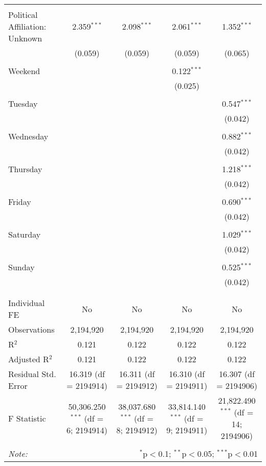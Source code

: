 \documentclass[
]{article}
\begin{document}
\begin{table}[!htbp]
{\begin{tabular}{@{\extracolsep{5pt}}lcccc}
  & & & & \\ 
 Political Affiliation: Unknown & 2.359$^{***}$ & 2.098$^{***}$ & 2.061$^{***}$ & 1.352$^{***}$ \\ 
  & (0.059) & (0.059) & (0.059) & (0.065) \\ 
  & & & & \\ 
 Weekend &  &  & 0.122$^{***}$ &  \\ 
  &  &  & (0.025) &  \\ 
  & & & & \\ 
 Tuesday &  &  &  & 0.547$^{***}$ \\ 
  &  &  &  & (0.042) \\ 
  & & & & \\ 
 Wednesday &  &  &  & 0.882$^{***}$ \\ 
  &  &  &  & (0.042) \\ 
  & & & & \\ 
 Thursday &  &  &  & 1.218$^{***}$ \\ 
  &  &  &  & (0.042) \\ 
  & & & & \\ 
 Friday &  &  &  & 0.690$^{***}$ \\ 
  &  &  &  & (0.042) \\ 
  & & & & \\ 
 Saturday &  &  &  & 1.029$^{***}$ \\ 
  &  &  &  & (0.042) \\ 
  & & & & \\ 
 Sunday &  &  &  & 0.525$^{***}$ \\ 
  &  &  &  & (0.042) \\ 
  & & & & \\ 
\hline \\[-1.8ex] 
Individual FE & No & No & No & No \\ 
Observations & 2,194,920 & 2,194,920 & 2,194,920 & 2,194,920 \\ 
R$^{2}$ & 0.121 & 0.122 & 0.122 & 0.122 \\ 
Adjusted R$^{2}$ & 0.121 & 0.122 & 0.122 & 0.122 \\ 
Residual Std. Error & 16.319 (df = 2194914) & 16.311 (df = 2194912) & 16.310 (df = 2194911) & 16.307 (df = 2194906) \\ 
F Statistic & 50,306.250$^{***}$ (df = 6; 2194914) & 38,037.680$^{***}$ (df = 8; 2194912) & 33,814.140$^{***}$ (df = 9; 2194911) & 21,822.490$^{***}$ (df = 14; 2194906) \\ 
\hline 
\hline \\[-1.8ex] 
\textit{Note:}  & \multicolumn{4}{r}{$^{*}$p$<$0.1; $^{**}$p$<$0.05; $^{***}$p$<$0.01} \\ 
\end{tabular}
} 
\end{table} 
\newpage
\end{document}
